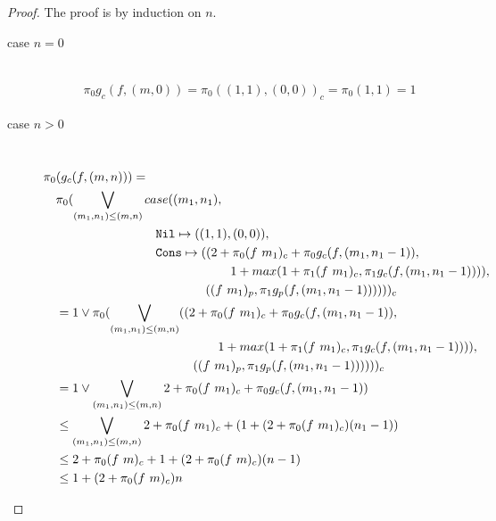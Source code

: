 \begin{proof}
   The proof is by induction on $n$.
  \begin{description}
    \item[case $n=0$]\mbox{}\\[-1.5\baselineskip]
      \begin{align*}
      \pi_0 g_c(f, (m, 0)) = \pi_0((1, 1), (0, 0))_c = \pi_0(1, 1) = 1
      \end{align*}
    \item[case $n>0$]\mbox{}\\[-1.5\baselineskip]
      \[\begin{split}
        &\pi_0(g_c(f, (m, n))) = \\
        &\quad \pi_0(\bigvee\limits_{(m_1, n_1) \leq (m, n)} case((m_1, n_1), \\
        &\quadfive\quadfour \T{Nil} \mapsto ((1, 1), (0, 0)), \\
        &\quadfive\quadfour \T{Cons} \mapsto ((2 + \pi_0(f\ m_1)_c + \pi_0g_c(f, (m_1, n_1-1)), \\
        &\quadfive\quadten                     1 + max(1 + \pi_1(f\ m_1)_c, \pi_1g_c(f, (m_1, n_1-1)))), \\
        &\quadfive\quadeight                  ((f\ m_1)_p, \pi_1 g_p(f, (m_1, n_1-1))))) )_c \\
        &\quad = 1 \vee \pi_0(\bigvee\limits_{(m_1, n_1) \leq (m, n)} ((2 + \pi_0(f\ m_1)_c + \pi_0g_c(f, (m_1, n_1-1)), \\
        &\quadfour\quadten                     1 + max(1 + \pi_1(f\ m_1)_c, \pi_1g_c(f, (m_1, n_1-1)))), \\
        &\quadfour\quadeight                  ((f\ m_1)_p, \pi_1 g_p(f, (m_1, n_1-1))))) )_c \\
        &\quad = 1 \vee \bigvee\limits_{(m_1, n_1) \leq (m, n)} 2 + \pi_0 (f\ m_1)_c + \pi_0 g_c(f, (m_1, n_1-1)) \\
        &\quad \leq \bigvee\limits_{(m_1, n_1) \leq (m, n)} 2 + \pi_0 (f\ m_1)_c + (1 + (2 + \pi_0 (f\ m_1)_c)(n_1-1)) \\
        &\quad \leq 2 + \pi_0 (f\ m)_c + 1 + (2 + \pi_0 (f\ m)_c)(n - 1) \\
        &\quad \leq 1 + (2 + \pi_0 (f\ m)_c)n \\
      \end{split}\]
  \end{description}
\end{proof}

